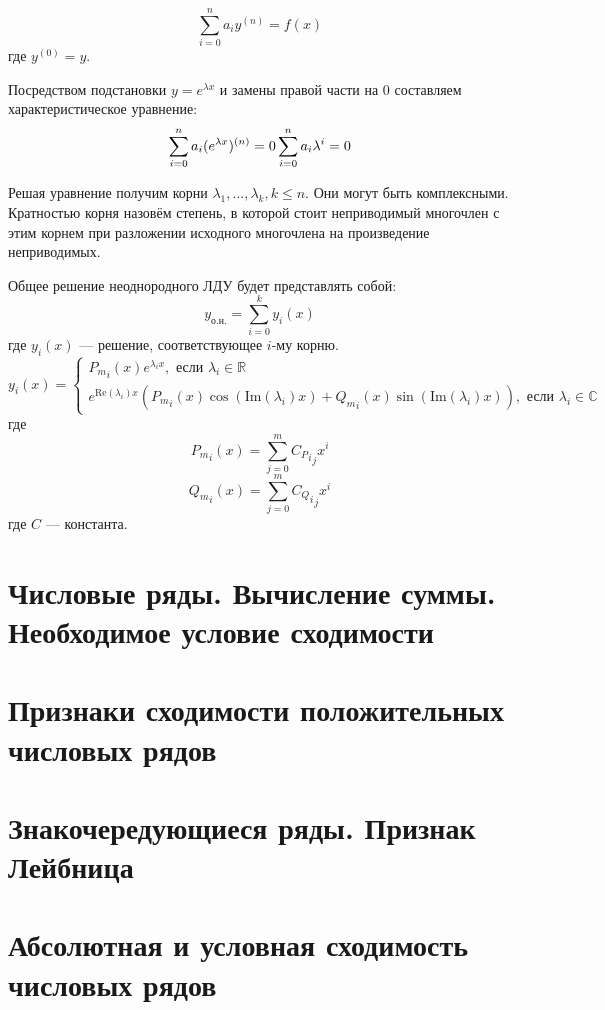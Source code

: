 \documentclass[12pt]{article}
\begin{document}
\[
    \sum_{i=0}^n a_iy^{(n)} = f(x)
\]
где $y^{(0)} = y$.

Посредством подстановки $y = e^{\lambda x}$ и замены правой части на 0 составляем характеристическое уравнение:
\[
    \sum_{i=0}^n a_i(e^{\lambda x})^{(n)} = 0 \\
    \sum_{i=0}^n a_i \lambda^i = 0 \\
\]

Решая уравнение получим корни $\lambda_1, ..., \lambda_k, k \leq n$. Они могут быть комплексными. Кратностью корня назовём степень, в которой стоит неприводимый многочлен с этим корнем при разложении исходного многочлена на произведение неприводимых.

Общее решение неоднородного ЛДУ будет представлять собой:
\[
    y_\text{о.н.} = \sum_{i = 0}^k y_i(x)
\]
где $y_i(x)$ — решение, соответствующее $i$-му корню.
\[
    y_i(x) = \begin{cases}
        {P_m}_i(x)e^{\lambda_i x}, \text{ если } \lambda_i \in \mathbb{R} \\
        e^{\text{Re}(\lambda_i) x}({P_m}_i(x)\cos(\text{Im}(\lambda_i)x) + {Q_m}_i(x)\sin(\text{Im}(\lambda_i)x)), \text{ если } \lambda_i \in \mathbb{C}
    \end{cases}
\]
где
\[
    {P_m}_i(x) = \sum_{j = 0}^m {{C_P}_i}_jx^i
\]
\[
    {Q_m}_i(x) = \sum_{j = 0}^m {{C_Q}_i}_jx^i
\]
где $C$ — константа.

\section{Числовые ряды. Вычисление суммы. Необходимое условие сходимости}

\section{Признаки сходимости положительных числовых рядов}

\section{Знакочередующиеся ряды. Признак Лейбница}

\section{Абсолютная и условная сходимость числовых рядов}
\end{document}
